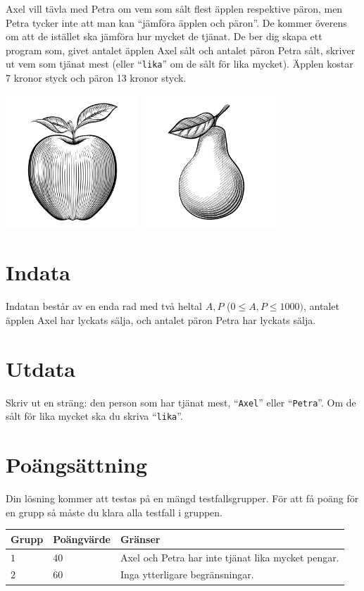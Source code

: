 Axel vill tävla med Petra om vem som sålt flest äpplen respektive päron, men Petra tycker inte att man kan ``jämföra äpplen och päron''.
De kommer överens om att de istället ska jämföra hur mycket de tjänat. De ber dig skapa ett program som, givet antalet äpplen Axel sålt och antalet päron Petra sålt,
skriver ut vem som tjänat mest (eller ``\texttt{lika}'' om de sålt för lika mycket). Äpplen kostar 7 kronor styck och päron 13 kronor styck.

\begin{center}
  \includegraphics[width=5cm]{apple.jpg}
  \includegraphics[width=5cm]{pear.jpg}
\end{center}

\section*{Indata}
Indatan består av en enda rad med två heltal $A,P$ ($0 \le A,P \le 1000)$, antalet äpplen Axel har lyckats sälja, och antalet päron Petra har lyckats sälja. 

\section*{Utdata}
Skriv ut en sträng: den person som har tjänat mest, ``\texttt{Axel}'' eller ``\texttt{Petra}''. Om de sålt för lika mycket ska du skriva ``\texttt{lika}''.

\section*{Poängsättning}
Din lösning kommer att testas på en mängd testfallsgrupper.
För att få poäng för en grupp så måste du klara alla testfall i gruppen.

\noindent
\begin{tabular}{| l | l | l |}
  \hline
  Grupp & Poängvärde & Gränser \\ \hline
  $1$   & $40$       & Axel och Petra har inte tjänat lika mycket pengar. \\ \hline
  $2$   & $60$       & Inga ytterligare begränsningar. \\ \hline
\end{tabular}
